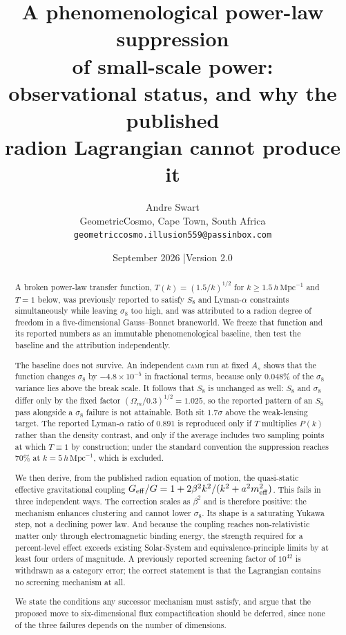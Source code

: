 \documentclass[11pt,a4paper]{article}
\title{\bfseries A phenomenological power-law suppression\\[2pt]
of small-scale power:\\[6pt]
\large observational status, and why the published\\
radion Lagrangian cannot produce it}
\author{Andre Swart\\[2pt]
\small GeometricCosmo, Cape Town, South Africa\\
\small \texttt{geometriccosmo.illusion559@passinbox.com}}
\date{September 2026 \quad|\quad Version 2.0}
\newcommand{\hMpc}{h\,\mathrm{Mpc}^{-1}}
\newcommand{\Geff}{G_{\rm eff}}
\newcommand{\meff}{m_{\rm eff}}
\begin{document}
\maketitle
\thispagestyle{empty}

\begin{abstract}
\noindent
A broken power-law transfer function, $T(k)=(1.5/k)^{1/2}$ for $k\ge1.5\,\hMpc$ and
$T=1$ below, was previously reported to satisfy $S_8$ and Lyman-$\alpha$ constraints
simultaneously while leaving $\sigma_8$ too high, and was attributed to a radion
degree of freedom in a five-dimensional Gauss--Bonnet braneworld. We freeze that
function and its reported numbers as an immutable phenomenological baseline, then
test the baseline and the attribution independently.

The baseline does not survive. An independent \textsc{camb} run at fixed $A_s$ shows
that the function changes $\sigma_8$ by $-4.8\times10^{-5}$ in fractional terms,
because only $0.048\%$ of the $\sigma_8$ variance lies above the break scale.
It follows that $S_8$ is unchanged as well: $S_8$ and $\sigma_8$ differ only by the
fixed factor $(\Omega_m/0.3)^{1/2}=1.025$, so the reported pattern of an $S_8$ pass
alongside a $\sigma_8$ failure is not attainable. Both sit $1.7\sigma$ above the
weak-lensing target. The reported Lyman-$\alpha$ ratio of $0.891$ is reproduced only
if $T$ multiplies $P(k)$ rather than the density contrast, and only if the average
includes two sampling points at which $T\equiv1$ by construction; under the standard
convention the suppression reaches $70\%$ at $k=5\,\hMpc$, which is excluded.

We then derive, from the published radion equation of motion, the quasi-static
effective gravitational coupling
$\Geff/G = 1+2\beta^2k^2/(k^2+a^2\meff^2)$. This fails in three independent ways.
The correction scales as $\beta^2$ and is therefore positive: the mechanism enhances
clustering and cannot lower $\sigma_8$. Its shape is a saturating Yukawa step, not a
declining power law. And because the coupling reaches non-relativistic matter only
through electromagnetic binding energy, the strength required for a percent-level
effect exceeds existing Solar-System and equivalence-principle limits by at least
four orders of magnitude. A previously reported screening factor of $10^{42}$ is
withdrawn as a category error; the correct statement is that the Lagrangian contains
no screening mechanism at all.

We state the conditions any successor mechanism must satisfy, and argue that the
proposed move to six-dimensional flux compactification should be deferred, since
none of the three failures depends on the number of dimensions.
\end{abstract}
\end{document}
